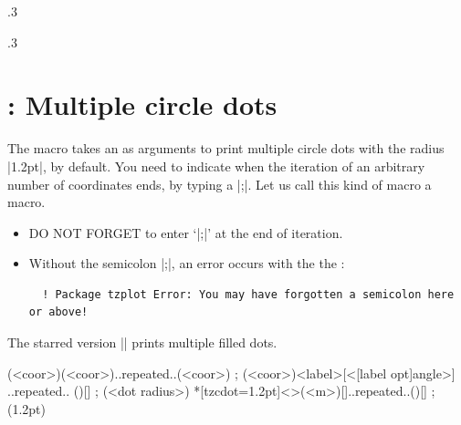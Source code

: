 \begin{tzcode}{.3}
\end{tzcode}

\begin{tzcode}{.3}
\end{tzcode}


\section{\protect\cmd{\tzcdots(*)}: Multiple circle dots}
\label{s:tzcdots}

The macro \icmd{\tzcdots} takes an  as arguments to print multiple circle dots with the radius |1.2pt|, by default.
You need to indicate when the iteration of an arbitrary number of coordinates ends, by typing a  |;|.
Let us call this kind of macro a  macro.

\remark
\begin{itemize}
\item DO NOT FORGET to enter `|;|' at the end of iteration.
\item Without the semicolon |;|, an error occurs with the the :
  \begin{verbatim}
  ! Package tzplot Error: You may have forgotten a semicolon here or above!
  \end{verbatim}
\end{itemize}


The starred version |\tzcdots*| prints multiple filled dots.

\begin{tzdef}{}
\tzcdots*(<coor>)(<coor>)..repeated..(<coor>) ;
 (<coor>){<label>}[<[label opt]angle>]
                            ..repeated.. (){}[] ; (<dot radius>)
 *[tzcdot=1.2pt]<>(<m>){}[]..repeated..(){}[] ; (1.2pt)
\end{tzdef}

